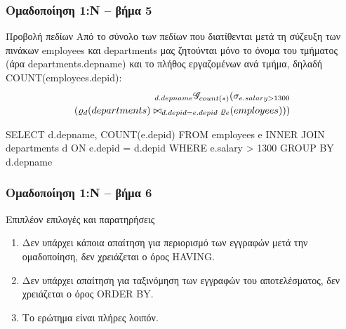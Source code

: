 \begin{frame}
\frametitle{Ομαδοποίηση 1:Ν -- βήμα 5}
\begin{minipage}{\wE}
\vspace{-1em}
\begin{block}{Προβολή πεδίων}
Από το σύνολο των πεδίων που διατίθενται μετά τη σύζευξη των πινάκων {\ra employees} και {\ra departments}
μας ζητούνται μόνο το όνομα του τμήματος (άρα {\ra departments.depname})
και το πλήθος εργαζομένων ανά τμήμα, δηλαδή  {\ra COUNT(employees.depid)}:
\[
  \begin{split}
   {}_{d.depname} \mathscr{G}_{count(*) }
   (
     \sigma_{e.salary > 1300}  \\
     (
       \varrho_{d}(departments)  \bowtie_{d.depid = e.depid}  \varrho_{e}(employees)
     )
   )
  \end{split} 
\]
\pause
\en
\begin{SQL}
  SELECT d.depname, COUNT(e.depid)
    FROM employees e INNER JOIN departments d
         ON e.depid = d.depid
   WHERE e.salary > 1300
GROUP BY d.depname
\end{SQL}
\el
  \end{block}
\end{minipage}
\end{frame}


\begin{frame}
\frametitle{Ομαδοποίηση 1:Ν -- βήμα 6}
\begin{minipage}{\wE}
  \begin{block}{Επιπλέον επιλογές και παρατηρήσεις}
     \begin{enumerate} \itemsep 6pt
       \item \pause Δεν υπάρχει κάποια απαίτηση για περιορισμό των εγγραφών
             μετά την ομαδοποίηση, δεν χρειάζεται ο όρος {\sq HAVING}.
       \item \pause  Δεν υπάρχει απαίτηση για ταξινόμηση των εγγραφών του αποτελέσματος,
             δεν χρειάζεται ο όρος {\sq ORDER BY}.
       \item \pause  Το ερώτημα είναι πλήρες λοιπόν.      
    \end{enumerate}
  \end{block}
\end{minipage}
\end{frame}



